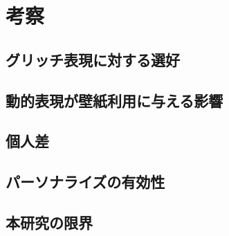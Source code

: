 \chapter{考察}

\section{グリッチ表現に対する選好}

\section{動的表現が壁紙利用に与える影響}

\section{個人差}

\section{パーソナライズの有効性}

\section{本研究の限界}
